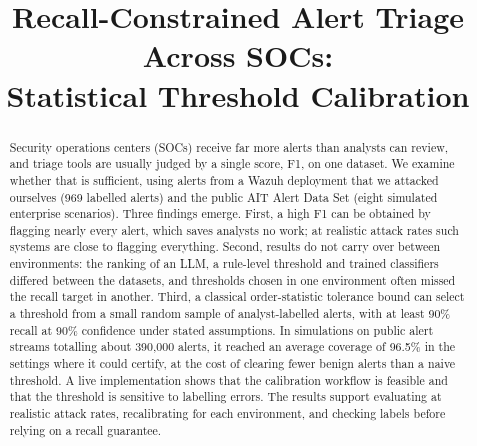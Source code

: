 \documentclass[conference]{IEEEtran}
\begin{document}
\title{Recall-Constrained Alert Triage Across SOCs:\\
Statistical Threshold Calibration}

\author{
\and
{}
}

\maketitle

\begin{abstract}
Security operations centers (SOCs) receive far more alerts than analysts can review, and triage tools
are usually judged by a single score, F1, on one dataset. We examine whether that is sufficient,
using alerts from a Wazuh deployment that we attacked ourselves (969 labelled alerts) and the public
AIT Alert Data Set (eight simulated enterprise scenarios). Three findings emerge. First, a high F1
can be obtained by flagging nearly every alert, which saves analysts no work; at realistic attack
rates such systems are close to flagging everything. Second, results do not carry over between
environments: the ranking of an LLM, a rule-level threshold and trained classifiers differed between
the datasets, and thresholds chosen in one environment often missed the recall target in another.
Third, a classical order-statistic tolerance bound can select a threshold from a small random sample
of analyst-labelled alerts, with at least 90\% recall at 90\% confidence under stated assumptions. In
simulations on public alert streams totalling about 390,000 alerts, it reached an average coverage
of 96.5\% in the settings where it could certify, at the cost of clearing fewer benign alerts than a
naive threshold. A live implementation shows that the calibration workflow is feasible and that the
threshold is sensitive to labelling errors. The results support evaluating at realistic attack
rates, recalibrating for each environment, and checking labels before relying on a recall
guarantee.
\end{abstract}
\end{document}

